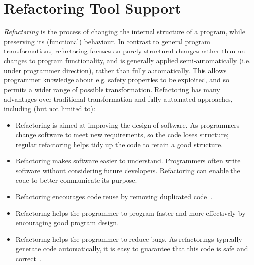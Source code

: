 \documentclass[final]{jfp1}
\begin{document}
\section{Refactoring Tool Support}
\emph{Refactoring} is the process of changing the internal structure of a
program, while preserving its (functional) behaviour. 
In contrast to general program transformations,
refactoring focuses on purely
structural changes rather than on changes to program functionality,
and is generally applied semi-automatically (i.e. under programmer
direction), rather than fully automatically.
This allows programmer knowledge about e.g. safety properties to be 
exploited, and so permits a wider range of possible transformation.
Refactoring has
many advantages over traditional transformation and fully automated approaches,
including (but not limited to):
\begin{itemize}
\item Refactoring is aimed at improving the design of software. As programmers
  change software to meet new requirements, so the code loses structure;
  regular refactoring helps tidy up the code to retain a good structure.
\item Refactoring makes software easier to understand. Programmers often
  write software without considering future developers. Refactoring
  can enable the code to better communicate its purpose.
\item Refactoring encourages code reuse by removing duplicated code~\cite{brownpepm}.
\item Refactoring helps the programmer to program faster and more effectively by encouraging
  good program design.
\item Refactoring helps the programmer to reduce bugs. As refactorings
  typically generate code automatically, it is
  easy to guarantee that this code is safe and correct~\cite{thompsonsultana}.
\end{itemize}
\end{document}

